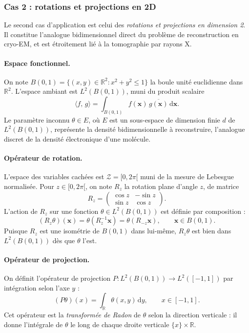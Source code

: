 \documentclass[12pt, a4paper]{article}
\theoremstyle{definition}
\newcommand{\R}{\mathbb{R}}
\newcommand{\Zcal}{\mathcal{Z}}
\newcommand{\inner}[2]{\langle #1,\, #2 \rangle}
\begin{document}
\subsubsection{Cas 2 : rotations et projections en 2D}
\label{subsubsec:cas2}

Le second cas d'application est celui des \textit{rotations et projections en
dimension 2}. Il constitue l'analogue bidimensionnel direct du problème de
reconstruction en cryo-EM, et est étroitement lié à la tomographie par rayons X.

\paragraph{Espace fonctionnel.}
On note $B(0,1) = \{(x,y) \in \R^2 : x^2 + y^2 \leq 1\}$ la boule unité
euclidienne dans $\R^2$. L'espace ambiant est $L^2(B(0,1))$, muni du produit
scalaire
\[
    \inner{f}{g} = \int_{B(0,1)} f(\mathbf{x})\,\overline{g(\mathbf{x})}\,\mathrm{d}\mathbf{x}.
\]
Le paramètre inconnu $\theta \in E$, où $E$ est un sous-espace de dimension
finie $d$ de $L^2(B(0,1))$, représente la densité bidimensionnelle à reconstruire,
l'analogue discret de la densité électronique d'une molécule.

\paragraph{Opérateur de rotation.}
L'espace des variables cachées est $\Zcal = [0, 2\pi[$ muni de la mesure de
Lebesgue normalisée. Pour $z \in [0, 2\pi[$, on note $R_z$ la rotation plane
d'angle $z$, de matrice
\[
    R_z = \begin{pmatrix} \cos z & -\sin z \\ \sin z & \cos z \end{pmatrix}.
\]
L'action de $R_z$ sur une fonction $\theta \in L^2(B(0,1))$ est définie par
composition :
\[
    (R_z\theta)(\mathbf{x}) = \theta(R_z^{-1}\mathbf{x}) = \theta(R_{-z}\mathbf{x}),
    \qquad \mathbf{x} \in B(0,1).
\]
Puisque $R_z$ est une isométrie de $B(0,1)$ dans lui-même, $R_z\theta$ est bien
dans $L^2(B(0,1))$ dès que $\theta$ l'est.

\paragraph{Opérateur de projection.}
On définit l'opérateur de projection $P : L^2(B(0,1)) \to L^2([-1,1])$ par
intégration selon l'axe $y$ :
\[
    (P\theta)(x) = \int_{\R} \theta(x, y)\,\mathrm{d}y, \qquad x \in [-1, 1].
\]
Cet opérateur est la \textit{transformée de Radon} de $\theta$ selon la direction
verticale : il donne l'intégrale de $\theta$ le long de chaque droite
verticale $\{x\} \times \R$.
\end{document}
